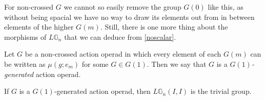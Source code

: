 For non-crossed $G$ we cannot so easily remove the group $G(0)$ like this, as without being spacial we have no way to draw its elements out from in between elements of the higher $G(m)$. Still, there is one more thing about the morphisms of $L\mathbb{G}_n$ that we can deduce from \cref{noscalar}.

\begin{defn} Let $G$ be a non-crossed action operad in which every element of each $G(m)$ can be written as $\mu(g;e_m)$ for some $G \in G(1)$. Then we say that $G$ is a \emph{$G(1)$-generated} action operad. \end{defn}

\begin{lem} \label{noscalarnoncross} If $G$ is a $G(1)$-generated action operad, then $L\mathbb{G}_n(I,I)$ is the trivial group.
\end{lem}
